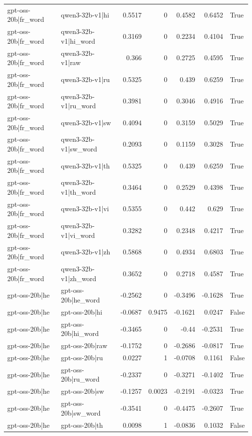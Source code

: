 \begin{table}
\begin{tabular}{l l r r r r l}
gpt-oss-20b|fr_word & qwen3-32b-v1|hi & 0.5517 & 0 & 0.4582 & 0.6452 & True \\
gpt-oss-20b|fr_word & qwen3-32b-v1|hi_word & 0.3169 & 0 & 0.2234 & 0.4104 & True \\
gpt-oss-20b|fr_word & qwen3-32b-v1|raw & 0.366 & 0 & 0.2725 & 0.4595 & True \\
gpt-oss-20b|fr_word & qwen3-32b-v1|ru & 0.5325 & 0 & 0.439 & 0.6259 & True \\
gpt-oss-20b|fr_word & qwen3-32b-v1|ru_word & 0.3981 & 0 & 0.3046 & 0.4916 & True \\
gpt-oss-20b|fr_word & qwen3-32b-v1|sw & 0.4094 & 0 & 0.3159 & 0.5029 & True \\
gpt-oss-20b|fr_word & qwen3-32b-v1|sw_word & 0.2093 & 0 & 0.1159 & 0.3028 & True \\
gpt-oss-20b|fr_word & qwen3-32b-v1|th & 0.5325 & 0 & 0.439 & 0.6259 & True \\
gpt-oss-20b|fr_word & qwen3-32b-v1|th_word & 0.3464 & 0 & 0.2529 & 0.4398 & True \\
gpt-oss-20b|fr_word & qwen3-32b-v1|vi & 0.5355 & 0 & 0.442 & 0.629 & True \\
gpt-oss-20b|fr_word & qwen3-32b-v1|vi_word & 0.3282 & 0 & 0.2348 & 0.4217 & True \\
gpt-oss-20b|fr_word & qwen3-32b-v1|zh & 0.5868 & 0 & 0.4934 & 0.6803 & True \\
gpt-oss-20b|fr_word & qwen3-32b-v1|zh_word & 0.3652 & 0 & 0.2718 & 0.4587 & True \\
gpt-oss-20b|he & gpt-oss-20b|he_word & -0.2562 & 0 & -0.3496 & -0.1628 & True \\
gpt-oss-20b|he & gpt-oss-20b|hi & -0.0687 & 0.9475 & -0.1621 & 0.0247 & False \\
gpt-oss-20b|he & gpt-oss-20b|hi_word & -0.3465 & 0 & -0.44 & -0.2531 & True \\
gpt-oss-20b|he & gpt-oss-20b|raw & -0.1752 & 0 & -0.2686 & -0.0817 & True \\
gpt-oss-20b|he & gpt-oss-20b|ru & 0.0227 & 1 & -0.0708 & 0.1161 & False \\
gpt-oss-20b|he & gpt-oss-20b|ru_word & -0.2337 & 0 & -0.3271 & -0.1402 & True \\
gpt-oss-20b|he & gpt-oss-20b|sw & -0.1257 & 0.0023 & -0.2191 & -0.0323 & True \\
gpt-oss-20b|he & gpt-oss-20b|sw_word & -0.3541 & 0 & -0.4475 & -0.2607 & True \\
gpt-oss-20b|he & gpt-oss-20b|th & 0.0098 & 1 & -0.0836 & 0.1032 & False \\

\end{tabular}
\end{table}
